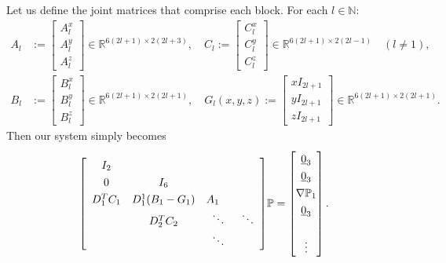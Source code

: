 \documentclass[11pt, oneside]{article}   	%
\newcommand{\R}{\mathbb{R}}
\newcommand{\N}{\mathbb{N}}
\newcommand{\bigP}{\mathbb{P}}
\newcommand{\gradP}{\nabla\mathbb{P}}
\begin{document}
Let us define the joint matrices that comprise each block. For each \(l \in \N\):
\begin{align}
A_l &:= \begin{bmatrix}
		A^x_l \\
		A^y_l \\
		A^z_l
	    \end{bmatrix} \in \R^{6(2l+1)\times2(2l+3)}, \quad
C_l := \begin{bmatrix}
		C^x_l \\
		C^y_l \\
		C^z_l
	    \end{bmatrix} \in \R^{6(2l+1)\times2(2l-1)} \quad (l \ne 1), \\
B_l &:= \begin{bmatrix}
		B^x_l \\
		B^y_l \\
		B^z_l
	    \end{bmatrix} \in \R^{6(2l+1)\times2(2l+1)}, \quad
G_l(x,y,z) := \begin{bmatrix}
		xI_{2l+1} \\
		yI_{2l+1} \\
		zI_{2l+1}
	    \end{bmatrix} \in \R^{6(2l+1)\times2(2l+1)}.
\end{align}
Then our system simply becomes
\begin{align}
\renewcommand\arraystretch{1.3}
\mleft[
\begin{array}{cccc}
		I_2 \\
		0 & I_6 & & \\
		D^T_1 C_1 & D^1_1(B_1-G_1) & A_1 \quad & \\
		& D^T_2 C_2 & \ddots & \ddots \\
		& & \ddots &
\end{array}
\mright]
\bigP
=
\begin{bmatrix}
	\underline{0}_3 \\ \underline{0}_3 \\ \gradP_1 \\ \underline{0}_3 \\ \\ \vdots \\
\end{bmatrix}.
\end{align}
\end{document}
